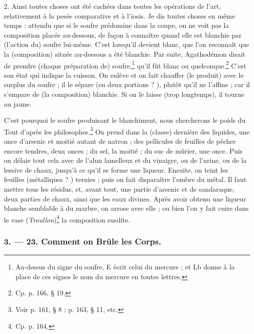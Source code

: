 \documentclass[a4paper, 11pt, oneside, polutonikogreek, french]{article}
\begin{document}
2. Ainsi toutes choses ont été cachées dans toutes les opérations de l'art, relativement à la pesée comparative et à l'iosis. Je dis toutes choses en même temps : attendu que si le soufre prédomine dans la coupe, on ne voit pas la composition placée au-dessous, de façon à connaître quand elle est blanchie par (l'action du) soufre lui-même. C'est lorsqu'il devient blanc, que l'on reconnaît que la (composition) située au-dessous a été blanchie. Par suite, Agathodémon disait de prendre (chaque préparation de) soufre,\footnote{Au-dessus du signe du soufre, E écrit celui du mercure ; et Lb donne à la place de ces signes le nom du mercure en toutes lettres.} qu'il fût blanc ou quelconque.\footnote{Cp. p. 166, § 19.} C'est son état qui indique la cuisson. On enlève et on fait chauffer (le produit) avec le surplus du soufre ; il le sépare (en deux portions ? ), plutôt qu'il ne l'affine ; car il s'empare de (la composition) blanchie. Si on le laisse (trop longtemps), il tourne au jaune.

C'est pourquoi le soufre produisant le blanchiment, nous chercherons le poids du Tout d'après les philosophes.\footnote{Voir p. 161, § 8 ; p. 163, § 11, etc.} On prend dans la (classe) dernière des liquides, une once d'arsenic et moitié autant de natron ; des pellicules de feuilles de pêcher encore tendres, deux onces ; du sel, la moitié ; du suc de mûrier, une once. Puis on délaie tout cela avec de l'alun lamelleux et du vinaigre, ou de l'urine, ou de la lessive de chaux, jusqu'à ce qu'il se forme une liqueur. Ensuite, on teint les feuilles (métalliques ? ) ternies ; puis on fait disparaître l'ombre du métal. Il faut mettre tous les résidus, et, avant tout, une partie d'arsenic et de sandaraque, deux parties de chaux, ainsi que les eaux divines. Après avoir obtenu une liqueur blanche semblable à du marbre, on arrose avec elle ; ou bien l'on y fait cuire dans le vase (\emph{Troullon})\footnote{Cp. p. 164.} la composition susdite.

\bigskip
\centerline{\EightStarTaper}
\centerline{\EightStarTaper\EightStarTaper}
\bigskip

\subsubsection{3. --- 23. Comment on Brûle les Corps.}
\end{document}
